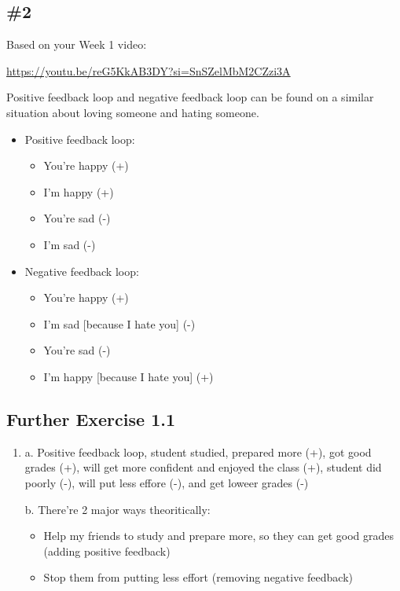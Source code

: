 \documentclass[12pt]{article}
\begin{document}
\subsection*{\#2}
Based on your Week 1 video:
\begin{center}
    \url{https://youtu.be/reG5KkAB3DY?si=SnSZelMbM2CZzi3A}
\end{center}
Positive feedback loop and negative feedback loop can be found on a similar situation about
loving someone and hating someone.
\begin{itemize}
    \item Positive feedback loop: 
    \begin{itemize}
        \item You're happy (+)
        \item I'm happy (+)
        \item You're sad (-)
        \item I'm sad (-)
    \end{itemize}
    \item Negative feedback loop:
    \begin{itemize}
        \item You're happy (+)
        \item I'm sad [because I hate you] (-)
        \item You're sad (-)
        \item I'm happy [because I hate you] (+)
    \end{itemize}
\end{itemize}

\subsection*{Further Exercise 1.1}
\begin{enumerate}
    \item a. Positive feedback loop, student studied, prepared more (+), got good grades (+),
    will get more confident and enjoyed the class (+), student did poorly (-), will put less effore (-),
    and get loweer grades (-)
    
    b. There're 2 major ways theoritically:
    
    \begin{itemize}
        \item Help my friends to study and prepare more, so they can get good grades (adding positive feedback)
        \item Stop them from putting less effort (removing negative feedback)
    \end{itemize}
\end{enumerate}
\end{document}
